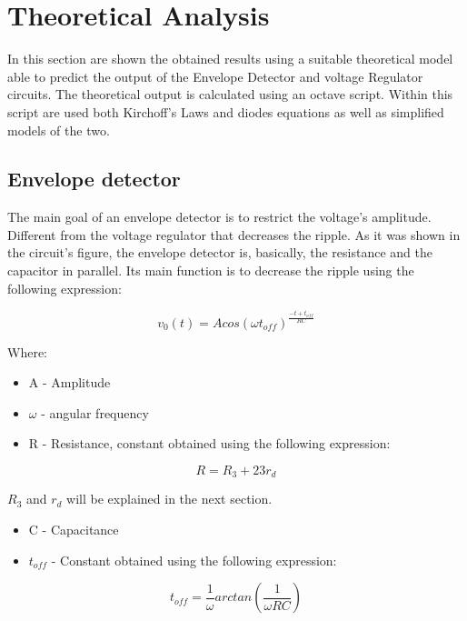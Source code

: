 \section{Theoretical Analysis}
\label{sec:analysis}

In this section are shown the obtained results using a suitable theoretical model able to predict the output of the Envelope Detector and voltage Regulator circuits.
The theoretical output is calculated using an octave script. Within this script are used both Kirchoff's Laws and diodes equations as well as simplified models of the two. 

\subsection{Envelope detector}
The main goal of an envelope detector is to restrict the voltage's amplitude. Different from the voltage regulator that decreases the ripple. As it was shown in the circuit's figure, the envelope detector is, basically, the resistance and the capacitor in parallel. Its main function is to decrease the ripple using the following expression:\par
\begin{equation}
    v_0(t) = Acos(\omega t_{off})^{\frac{-t+t_{off}}{RC}}
\end{equation}\par
Where: \par
\begin{itemize}
  \item A - Amplitude
  \item $\omega$ - angular frequency
  \item R - Resistance, constant obtained using the following expression:
\end{itemize}
\begin{equation}
    R = R_3 + 23r_d 
\end{equation}\par
$R_3$ and $r_d$ will be explained in the next section.\par
\begin{itemize}
  \item C - Capacitance
  \item $t_{off}$ - Constant obtained using the following expression:
\end{itemize}
\begin{equation}
    t_{off}=\frac{1}{\omega}arctan(\frac{1}{\omega RC})
\end{equation}\par

